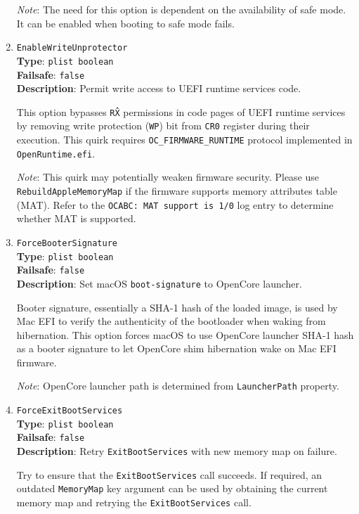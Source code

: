 \documentclass[]{article}
\begin{document}
\begin{enumerate}
  \emph{Note}: The need for this option is dependent on the availability of safe mode.
  It can be enabled when booting to safe mode fails.

\item
  \texttt{EnableWriteUnprotector}\\
  \textbf{Type}: \texttt{plist\ boolean}\\
  \textbf{Failsafe}: \texttt{false}\\
  \textbf{Description}: Permit write access to UEFI runtime services code.

  This option bypasses \texttt{R\^X} permissions in code pages of UEFI runtime
  services by removing write protection (\texttt{WP}) bit from \texttt{CR0}
  register during their execution. This quirk requires \texttt{OC\_FIRMWARE\_RUNTIME}
  protocol implemented in \texttt{OpenRuntime.efi}.

  \emph{Note}: This quirk may potentially weaken firmware security. Please use
  \texttt{RebuildAppleMemoryMap} if the firmware supports memory attributes table (MAT).
  Refer to the \texttt{OCABC: MAT support is 1/0} log entry to determine whether MAT is supported.

\item
  \texttt{ForceBooterSignature}\\
  \textbf{Type}: \texttt{plist\ boolean}\\
  \textbf{Failsafe}: \texttt{false}\\
  \textbf{Description}: Set macOS \texttt{boot-signature} to OpenCore launcher.

  Booter signature, essentially a SHA-1 hash of the loaded image, is used by Mac EFI
  to verify the authenticity of the bootloader when waking from hibernation. This
  option forces macOS to use OpenCore launcher SHA-1 hash as a booter signature to let
  OpenCore shim hibernation wake on Mac EFI firmware.

  \emph{Note}: OpenCore launcher path is determined from \texttt{LauncherPath} property.

\item
  \texttt{ForceExitBootServices}\\
  \textbf{Type}: \texttt{plist\ boolean}\\
  \textbf{Failsafe}: \texttt{false}\\
  \textbf{Description}: Retry \texttt{ExitBootServices} with new memory map on failure.

  Try to ensure that the \texttt{ExitBootServices} call succeeds. If required, an
  outdated \texttt{MemoryMap} key argument can be used by obtaining the current
  memory map and retrying the \texttt{ExitBootServices} call.


\end{enumerate}
\end{document}

